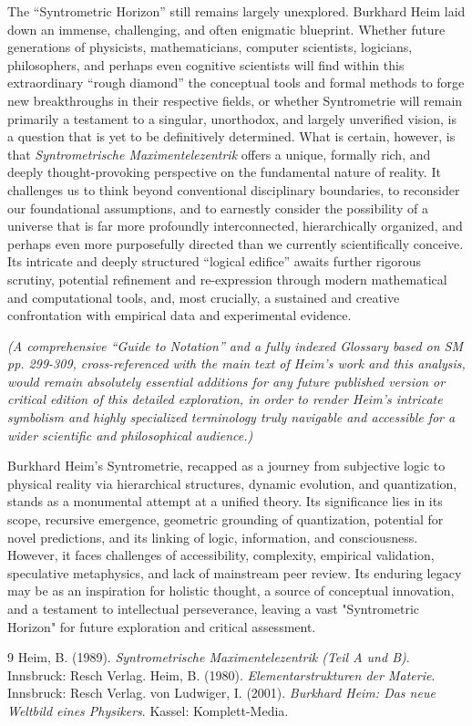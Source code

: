 \documentclass[12pt]{article}
\newcommand{\q}[1]{\enquote{#1}}
\begin{document}
The \enquote{Syntrometric Horizon} still remains largely unexplored. Burkhard Heim laid down an immense, challenging, and often enigmatic blueprint. Whether future generations of physicists, mathematicians, computer scientists, logicians, philosophers, and perhaps even cognitive scientists will find within this extraordinary \enquote{rough diamond} the conceptual tools and formal methods to forge new breakthroughs in their respective fields, or whether Syntrometrie will remain primarily a testament to a singular, unorthodox, and largely unverified vision, is a question that is yet to be definitively determined. What is certain, however, is that \textit{Syntrometrische Maximentelezentrik} offers a unique, formally rich, and deeply thought-provoking perspective on the fundamental nature of reality. It challenges us to think beyond conventional disciplinary boundaries, to reconsider our foundational assumptions, and to earnestly consider the possibility of a universe that is far more profoundly interconnected, hierarchically organized, and perhaps even more purposefully directed than we currently scientifically conceive. Its intricate and deeply structured \q{logical edifice} awaits further rigorous scrutiny, potential refinement and re-expression through modern mathematical and computational tools, and, most crucially, a sustained and creative confrontation with empirical data and experimental evidence.

\textit{(A comprehensive \enquote{Guide to Notation} and a fully indexed Glossary based on SM pp. 299-309, cross-referenced with the main text of Heim's work and this analysis, would remain absolutely essential additions for any future published version or critical edition of this detailed exploration, in order to render Heim's intricate symbolism and highly specialized terminology truly navigable and accessible for a wider scientific and philosophical audience.)}

Burkhard Heim's Syntrometrie, recapped as a journey from subjective logic to physical reality via hierarchical structures, dynamic evolution, and quantization, stands as a monumental attempt at a unified theory. Its significance lies in its scope, recursive emergence, geometric grounding of quantization, potential for novel predictions, and its linking of logic, information, and consciousness. However, it faces challenges of accessibility, complexity, empirical validation, speculative metaphysics, and lack of mainstream peer review. Its enduring legacy may be as an inspiration for holistic thought, a source of conceptual innovation, and a testament to intellectual perseverance, leaving a vast "Syntrometric Horizon" for future exploration and critical assessment.

\clearpage
\begin{thebibliography}{9}
Heim, B. (1989). \textit{Syntrometrische Maximentelezentrik (Teil A und B)}. 
Innsbruck: Resch Verlag.
Heim, B. (1980). \textit{Elementarstrukturen der Materie}. 
Innsbruck: Resch Verlag.
von Ludwiger, I. (2001). \textit{Burkhard Heim: Das neue Weltbild eines Physikers}. 
Kassel: Komplett-Media.
\end{thebibliography}
\end{document}
